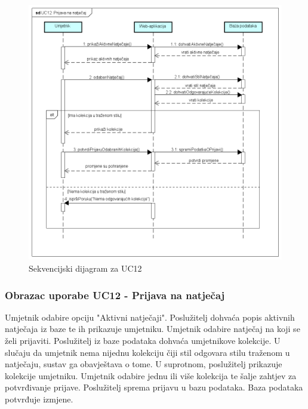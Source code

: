 		\begin{figure}[H]
			
			\includegraphics[width=\textwidth,height=\textheight,keepaspectratio]{sd_uc12}
			\caption{Sekvencijski dijagram za UC12}
			
		\end{figure}
		\eject
		
		\subsubsection{Obrazac uporabe UC12 - Prijava na natječaj}
		
		{Umjetnik odabire opciju "Aktivni natječaji". Poslužitelj dohvaća popis aktivnih natječaja iz baze te
			ih prikazuje umjetniku. Umjetnik odabire natječaj na koji se želi prijaviti. Poslužitelj iz baze podataka dohvaća umjetnikove kolekcije. U slučaju da umjetnik nema
			nijednu kolekciju čiji stil odgovara stilu traženom u natječaju, sustav ga obavještava o tome. 
			U suprotnom, poslužitelj prikazuje kolekcije umjetniku. Umjetnik odabire jednu ili više kolekcija
			te šalje zahtjev za potvrđivanje prijave. Poslužitelj sprema prijavu u bazu podataka. Baza podataka potvrđuje
			izmjene.}
		
